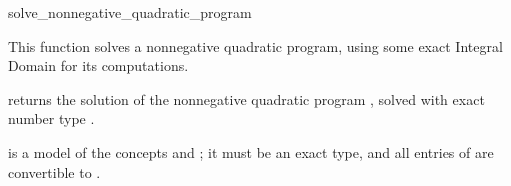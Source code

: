\begin{ccRefFunction}{solve_nonnegative_quadratic_program}


This function solves a nonnegative quadratic program, using some exact
Integral Domain  for its computations.   

{returns the solution of the nonnegative quadratic program , solved
with exact number type .}

 is a model of the concepts  and
; it must
be an exact type, and all entries of  are convertible to 
.

\end{ccRefFunction}
